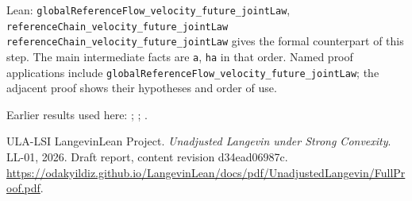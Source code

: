 \documentclass[11pt,a4paper]{article}
\begin{document}
\begin{leanbox}{Lean: \texttt{globalReferenceFlow\_\allowbreak{}velocity\_\allowbreak{}future\_\allowbreak{}jointLaw}, \texttt{referenceChain\_\allowbreak{}velocity\_\allowbreak{}future\_\allowbreak{}jointLaw}}
\texttt{reference\allowbreak{}Chain\_\allowbreak{}velocity\_\allowbreak{}future\_\allowbreak{}joint\allowbreak{}Law} gives the formal counterpart of this step. The main intermediate facts are \texttt{a}, \texttt{ha} in that order. Named proof applications include \texttt{global\allowbreak{}Reference\allowbreak{}Flow\_\allowbreak{}velocity\_\allowbreak{}future\_\allowbreak{}joint\allowbreak{}Law}; the adjacent proof shows their hypotheses and order of use.
\end{leanbox}


Earlier results used here: \cite[Section~3.17.1]{LangevinLean2026ULASC}; \cite[Section~3.26.13]{LangevinLean2026ULASC}; \cite[Section~3.26.3]{LangevinLean2026ULASC}.

\begin{thebibliography}{ULA-LSI}
LangevinLean Project. \emph{Unadjusted Langevin under Strong Convexity}. LL-01, 2026. Draft report, content revision d34ead06987c. \url{https://odakyildiz.github.io/LangevinLean/docs/pdf/UnadjustedLangevin/FullProof.pdf}.
\end{thebibliography}
\end{document}
